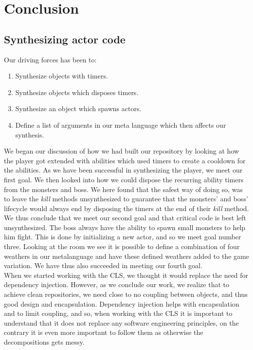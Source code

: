 \section{Conclusion}
\subsection{Synthesizing actor code}
Our driving forces has been to:
\begin{enumerate}
	\item Synthesize objects with timers.
	\item Synthesize objects which disposes timers.
	\item Synthesize an object which spawns actors.
	\item Define a list of arguments in our meta language which then affects our synthesis. 
\end{enumerate}
We began our discussion of how we had built our repository by looking at how the player got extended with abilities which used timers to create a cooldown for the abilities. As we have been successful in synthesizing the player, we meet our first goal. We then looked into how we could dispose the recurring ability timers from the monsters and boss. We here found that the safest way of doing so, was to leave the \textit{kill} methods unsynthesized to guarantee that the monsters' and boss' lifecycle would always end by disposing the timers at the end of their \textit{kill} method. We thus conclude that we meet our second goal and that critical code is best left unsynthesized. The boss always have the ability to spawn small monsters to help him fight. This is done by initializing a new actor, and so we meet goal number three. Looking at the room we see it is possible to define a combination of four weathers in our metalanguage and have these defined weathers added to the game variation. We have thus also succeeded in meeting our fourth goal.\\
When we started working with the CLS, we thought it would replace the need for dependency injection. However, as we conclude our work, we realize that to achieve clean repositories, we need close to no coupling between objects, and thus good design and encapsulation. Dependency injection helps with encapsulation and to limit coupling, and so, when working with the CLS it is important to understand that it does not replace any software engineering principles, on the contrary it is even more important to follow them as otherwise the decompositions gets messy.\\
